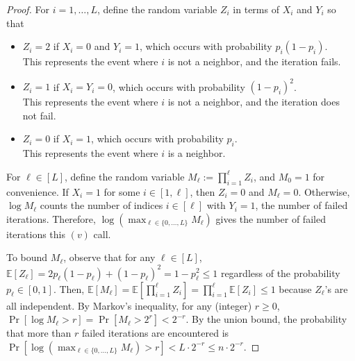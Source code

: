 \begin{proof}
For $i=1, \ldots, L$, define the random variable $Z_i$ in terms of $X_i$ and $Y_i$ so that
\begin{itemize}
\item $Z_i = 2$ if $X_i = 0$ and $Y_i = 1$, which occurs with probability $p_i(1-p_i)$. \\
This represents the event where $i$ is not a neighbor, and the iteration fails.
\item $Z_i = 1$ if $X_i = Y_i = 0$, which occurs with probability $(1-p_i)^2$.\\
 This represents the event where $i$ is not a neighbor, and the iteration does not fail.
\item $Z_i = 0$ if $X_i = 1$, which occurs with probability $p_i$. \\
This represents the event where $i$ is a neighbor.
\end{itemize}

For $\ell \in [L]$, define the random variable $M_\ell := \prod_{i=1}^\ell Z_i$, and $M_0 = 1$ for convenience. If $X_i = 1$ for some $i \in [1, \ell]$, then $Z_i = 0$ and $M_\ell = 0$. Otherwise, $\log M_\ell$ counts the number of indices $i \in [\ell]$ with $Y_i = 1$, the number of failed iterations. Therefore, $\log(\max_{\ell \in \{0, \ldots, L\}} M_\ell)$ gives the number of failed iterations this $(v)$ call.

To bound $M_\ell$, observe that for any $\ell\in[L]$, $\mathbb{E}[Z_\ell] = 2p_\ell(1-p_\ell) + (1-p_\ell)^2 = 1 - p_\ell^2 \leq 1$ regardless of the probability $p_\ell \in [0, 1]$. Then, $\mathbb{E}[M_\ell] = \mathbb{E}[\prod_{i=1}^\ell Z_i] = \prod_{i=1}^\ell \mathbb{E}[Z_i] \leq 1$ because $Z_\ell$'s are all independent. By Markov's inequality, for any (integer) $r \geq 0$, $\Pr[\log M_\ell > r] = \Pr[M_\ell > 2^r] < 2^{-r}$. By the union bound, the probability that more than $r$ failed iterations are encountered is $\Pr[\log(\max_{\ell \in \{0, \ldots, L\}} M_\ell) > r] < L\cdot 2^{-r} \leq n\cdot 2^{-r}$.


\end{proof}
